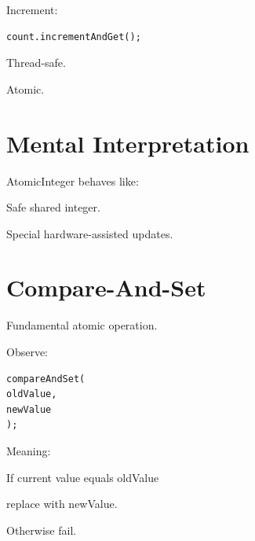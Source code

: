 \documentclass[11pt,a4paper]{book}
\begin{document}
Increment:

\begin{verbatim} 
count.incrementAndGet();
\end{verbatim}


Thread-safe.


Atomic.


\section{Mental Interpretation}

AtomicInteger behaves like:


Safe shared integer.


Special hardware-assisted updates.


\section{Compare-And-Set}

Fundamental atomic operation.


Observe:

\begin{verbatim} 
compareAndSet(
oldValue,
newValue
);
\end{verbatim}


Meaning:


If current value equals oldValue

replace with newValue.


Otherwise fail.

\end{document}
